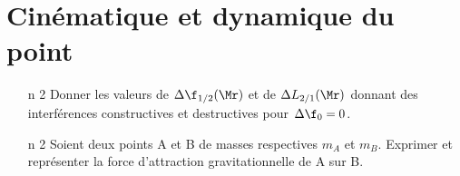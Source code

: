 \documentclass[a4paper, 10pt, final, garamond]{book}
\begin{document}
\setcounter{chapter}{13}


\chapter{Cinématique et dynamique du point}

\begin{enumerate}[label=\sqenumi]
	\item[n]{2}%
	      Donner les valeurs de $\Delta{\f_{1/2}(\Mr)}$ et de
	      $\Delta{L_{2/1}(\Mr)}$ donnant des interférences constructives et destructives
	      pour $\Delta{\f_0}=0$.
	      \smallbreak
	      \vspace{-30pt}
	      \vspace{-15pt}
	\item[n]{2}%
	      Soient deux points A et B de masses respectives $m_A$ et $m_B$. Exprimer et
	      représenter la force d'attraction gravitationnelle de A sur B.
	      \smallbreak
	      \noindent
	      \begin{minipage}{.6\linewidth}
		      \psw{
			      \vspace{-15pt}
			      \[
				      \Ff_{g,\rm A\ra B} \stm{=} -\Gc \frac{m_Am_B}{\rm AB^2}\ur
				      \qavec
				      \ur = \frac{\vvr{AB}}{\rm AB}
			      \]
			      \vspace{-15pt}
		      }
	      \end{minipage}
	      \hfill
	      \noindent
	      \begin{minipage}{.39\linewidth}
		      \begin{center}
\end{center}
\end{minipage}
\end{enumerate}
\end{document}

